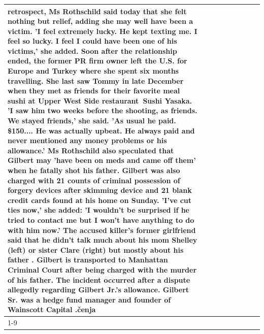 \begin{table}[H]
\begin{tabular}{lllrlllll}
retrospect, Ms Rothschild said today that she felt nothing but relief, adding she may well have been a victim. 'I feel extremely lucky. He kept texting me. I feel so lucky. I feel I could have been one of his victims,' she added. Soon after the relationship ended, the former PR firm owner left the U.S. for Europe and Turkey where she spent six months  travelling. She last saw Tommy in late December when they met as friends for their favorite meal sushi at Upper West Side restaurant Sushi Yasaka. 'I saw him two weeks before the shooting, as friends. We stayed friends,' she said. 'As usual he paid. \$150.... He was actually upbeat. He always paid and never mentioned any money problems or his allowance.' Ms Rothschild also speculated that Gilbert may 'have been on meds and came off them' when he fatally shot his father. Gilbert was also charged with 21 counts of criminal possession of forgery devices after skimming device and 21 blank credit cards found at his home on Sunday. 'I've cut ties now,' she added: 'I wouldn’t be surprised if he tried to contact me but I won’t have anything to do with him now.' The accused killer's former girlfriend said that he didn't talk much about his mom Shelley (left) or sister Clare (right) but mostly about his father . Gilbert is transported to Manhattan Criminal Court  after being charged with the murder of his father. The incident occurred after a dispute allegedly regarding Gilbert Jr.'s allowance. Gilbert Sr. was a hedge fund manager and founder of Wainscott Capital .čenja \\
\cline{1-9} \cline{2-9}

\end{tabular}
\end{table}
